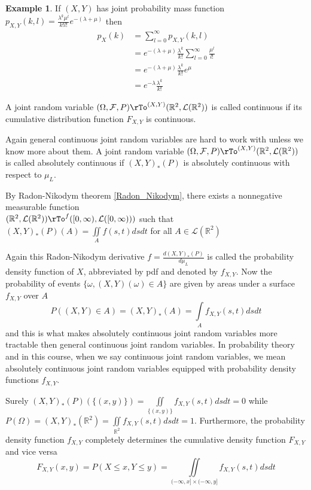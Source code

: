 \documentclass[12pt]{amsart}
\theoremstyle{definition}
\newtheorem{example}[theorem]{Example}
\begin{document}
\begin{example} If $(X, Y)$ has joint probability mass function $p_{X, Y}(k,l) = \frac{\lambda^k \mu^l}{k!l!}e^{-(\lambda + \mu)}$ then
\begin{align*}
p_X(k) & = \sum\limits_{l=0}^{\infty} p_{X, Y}(k, l) \\
 & = e^{-(\lambda + \mu)} \frac{\lambda^k}{k!} \sum\limits_{l=0}^{\infty} \frac{\mu^l}{l!} \\
 & = e^{-(\lambda + \mu)} \frac{\lambda^k}{k!} e^{\mu} \\
 & = e^{-\lambda}\frac{\lambda^k}{k!}
\end{align*}
\end{example}

\dfn A joint random variable $(\Omega, \mathcal{F}, P) \rTo^{(X, Y)} (\mathbb{R}^2, \mathcal{L}(\mathbb{R}^2))$ is called continuous if its cumulative distribution function $F_{X, Y}$ is continuous.

Again general continuous joint random variables are hard to work with unless we know more about them.
\dfn A joint random variable $(\Omega, \mathcal{F}, P) \rTo^{(X, Y)} (\mathbb{R}^2, \mathcal{L}(\mathbb{R}^2))$ is called absolutely continuous if $(X, Y)_*(P)$ is absolutely continuous with respect to $\mu_L$.

By Radon-Nikodym theorem \ref{Radon_Nikodym}, there exists a nonnegative measurable function\\
$(\mathbb{R}^2, \mathcal{L}(\mathbb{R}^2)) \rTo^f ([0, \infty), \mathcal{L}([0, \infty)))$ such that $(X, Y)_*(P)(A) = \iint \limits_{A} f(s, t) ds dt$ for all $A \in \mathcal{L}(\mathbb{R}^2)$

Again this Radon-Nikodym derivative $f = \frac{d(X, Y)_*(P)}{d\mu_L}$ is called the probability density function of $X$, abbreviated by pdf and denoted by $f_{X, Y}$. Now the probability of events $\{\omega, (X, Y)(\omega) \in A\}$  are given by areas under a surface $f_{X, Y}$ over $A$
$$P((X, Y) \in A) = (X, Y)_*(A) = \int\limits_A f_{X, Y}(s, t) ds dt$$
and this is what makes absolutely continuous joint random variables more tractable then general continuous joint random variables. In probability  theory and in this course, when we say continuous joint random variables, we mean absolutely continuous joint random variables equipped with probability density functions $f_{X, Y}$.

Surely $(X, Y)_*(P)(\{(x, y)\}) = \iint\limits_{\{(x, y)\}} f_{X, Y}(s, t) ds dt = 0$ while $P(\Omega) = (X, Y)_*(\mathbb{R}^2) = \iint\limits_{\mathbb{R}^2} f_{X, Y}(s, t) ds dt = 1$. Furthermore, the probability density function $f_{X, Y}$ completely determines the cumulative density function $F_{X, Y}$ and vice versa
$$F_{X, Y}(x, y) = P(X \leq x, Y \leq y) = \iint\limits_{(-\infty, x] \times (-\infty, y]} f_{X, Y}(s, t) ds dt$$
\end{document}
